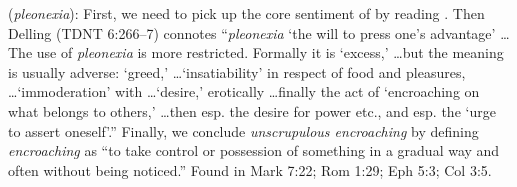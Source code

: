 \item[Unscrupulous encroaching,]

(\textit{pleonexia}):
First, we need to pick up the core sentiment of  by reading . Then  Delling (TDNT 6:266--7) connotes ``\emph{pleonexia} `the will to press one's advantage' \ldots The use of \emph{pleonexia} is more restricted. Formally it is `excess,' \ldots but the meaning is usually adverse: `greed,' \ldots `insatiability' in respect of food and pleasures, \ldots `immoderation' with \ldots `desire,' erotically \ldots finally the act of `encroaching on what belongs to others,' \ldots then esp. the desire for power etc., and esp. the `urge to assert oneself'.'' Finally, we conclude \emph{unscrupulous encroaching} by defining \emph{encroaching} as ``to take control or possession of something in a gradual way and often without being noticed.''
Found in Mark 7:22; Rom 1:29; Eph 5:3; Col 3:5.
